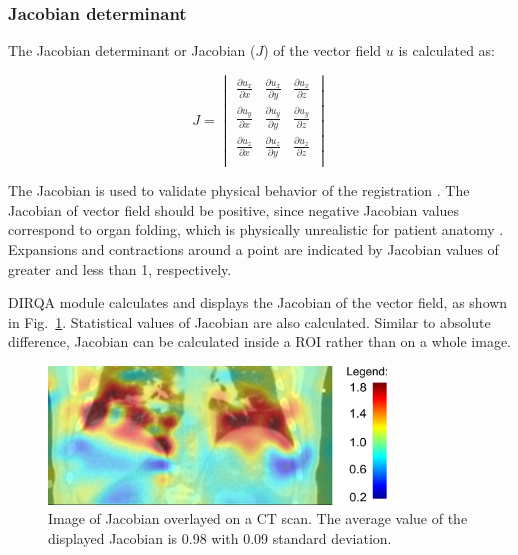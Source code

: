 \documentclass[type=dr, dr=rernat, accentcolor=tud7b,colorbacktitle, bigchapter, openright, twoside, 12pt ]{tudthesis}
\begin{document}
\newpage
\subsubsection{Jacobian determinant}
\label{Jacobian}

The Jacobian determinant or Jacobian ($J$) of the vector field $u$ is calculated as:



\begin{equation}
J = \begin{vmatrix} 
\frac{\partial u_x}{\partial x} & \frac{\partial u_x}{\partial y} & \frac{\partial u_x}{\partial z} \\
\frac{\partial u_y}{\partial x} & \frac{\partial u_y}{\partial y} & \frac{\partial u_y}{\partial z} \\
\frac{\partial u_z}{\partial x} & \frac{\partial u_z}{\partial y} & \frac{\partial u_z}{\partial z} \\
\end{vmatrix}
\end{equation}

The Jacobian is used to validate physical behavior of the registration \cite{Leow2007}. 
The Jacobian of vector field should be positive, since negative Jacobian values correspond to organ folding, 
which is physically unrealistic for patient anatomy \cite{ Rey2002, Chen2008}. 
Expansions and contractions around a point are indicated by Jacobian values of greater and less than 1, respectively.

DIRQA module calculates and displays the Jacobian of the vector field, as shown in Fig.~\ref{JacobianImage}. Statistical values of Jacobian are also calculated. Similar to absolute difference, Jacobian can be calculated inside a ROI rather than on a whole image.

\begin{figure}[H]
	\begin{center}		
		\includegraphics[width=0.8\textwidth]{./Images/jacobian.png}
		\caption{Image of Jacobian overlayed on a CT scan. The average value of the displayed Jacobian is 0.98 with 0.09 standard deviation.}
		\label{JacobianImage}
	\end{center}
\end{figure}
\end{document}
